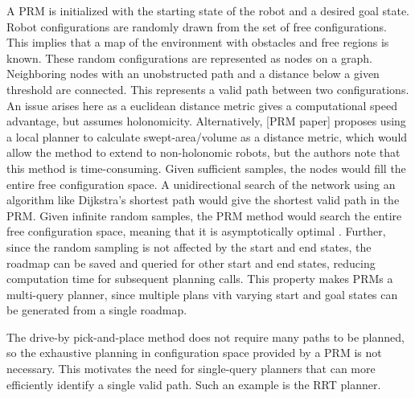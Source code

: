 \documentclass[12pt]{article}
\begin{document}
            A PRM is initialized with the starting state of the robot and a desired goal state. Robot configurations are randomly drawn from the set of free configurations. This implies that a map of the environment with obstacles and free regions is known. These random configurations are represented as nodes on a graph. Neighboring nodes with an unobstructed path and a distance below a given threshold are connected. This represents a valid path between two configurations. An issue arises here as a euclidean distance metric gives a computational speed advantage, but assumes holonomicity. Alternatively, [PRM paper] proposes using a local planner to calculate swept-area/volume as a distance metric, which would allow the method to extend to non-holonomic robots, but the authors note that this method is time-consuming. Given sufficient samples, the nodes would fill the entire free configuration space. A unidirectional search of the network using an algorithm like Dijkstra's shortest path would give the shortest valid path in the PRM. Given infinite random samples, the PRM method would search the entire free configuration space, meaning that it is asymptotically optimal \cite{newman_c18_2017}. Further, since the random sampling is not affected by the start and end states, the roadmap can be saved and queried for other start and end states, reducing computation time for subsequent planning calls. This property makes PRMs a multi-query planner, since multiple plans vith varying start and goal states can be generated from a single roadmap. 
            \par The drive-by pick-and-place method does not require many paths to be planned, so the exhaustive planning in configuration space provided by a PRM is not necessary. This motivates the need for single-query planners that can more efficiently identify a single valid path. Such an example is the RRT planner.
\end{document}
